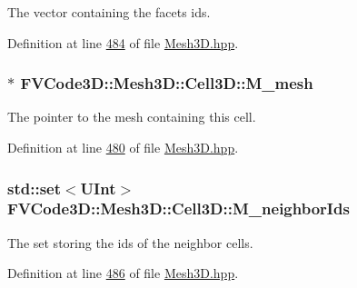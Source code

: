 The vector containing the facets ids. 



Definition at line \hyperlink{Mesh3D_8hpp_source_l00484}{484} of file \hyperlink{Mesh3D_8hpp_source}{Mesh3\+D.\+hpp}.

\subsubsection[{\texorpdfstring{M\+\_\+mesh}{M_mesh}}]{$\ast$ F\+V\+Code3\+D\+::\+Mesh3\+D\+::\+Cell3\+D\+::\+M\+\_\+mesh\hspace{0.3cm}{\ttfamily [private]}}\hypertarget{classFVCode3D_1_1Mesh3D_1_1Cell3D_a5f593479ad61eb1a043b7ec977db39bb}{}\label{classFVCode3D_1_1Mesh3D_1_1Cell3D_a5f593479ad61eb1a043b7ec977db39bb}


The pointer to the mesh containing this cell. 



Definition at line \hyperlink{Mesh3D_8hpp_source_l00480}{480} of file \hyperlink{Mesh3D_8hpp_source}{Mesh3\+D.\+hpp}.

\subsubsection[{\texorpdfstring{M\+\_\+neighbor\+Ids}{M_neighborIds}}]{\setlength{\rightskip}{0pt plus 5cm}std\+::set$<${\bf U\+Int}$>$ F\+V\+Code3\+D\+::\+Mesh3\+D\+::\+Cell3\+D\+::\+M\+\_\+neighbor\+Ids\hspace{0.3cm}{\ttfamily [private]}}\hypertarget{classFVCode3D_1_1Mesh3D_1_1Cell3D_ab05458f242974547b2657d0806fc3daa}{}\label{classFVCode3D_1_1Mesh3D_1_1Cell3D_ab05458f242974547b2657d0806fc3daa}


The set storing the ids of the neighbor cells. 



Definition at line \hyperlink{Mesh3D_8hpp_source_l00486}{486} of file \hyperlink{Mesh3D_8hpp_source}{Mesh3\+D.\+hpp}.

